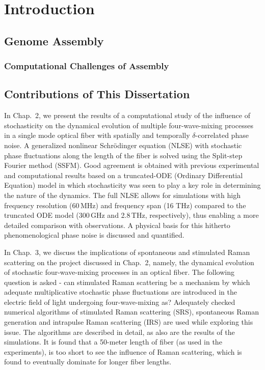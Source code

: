 
\newcommand{\edit}[1]{\textcolor{black}{#1}}

\renewcommand{\thechapter}{1}

\chapter{Introduction}



\section{Genome Assembly}

\subsection{Computational Challenges of Assembly}


\section{Contributions of This Dissertation}

In Chap.\ 2, we present the results of a computational study of the
influence of stochasticity on the dynamical evolution of multiple
four-wave-mixing processes in a single mode optical fiber with spatially
and temporally $\delta$-correlated phase noise. A generalized nonlinear
Schr\"odinger equation (NLSE) with stochastic phase fluctuations along the
length of the fiber is solved using the Split-step Fourier method
(SSFM). Good agreement is obtained with previous experimental and
computational results based on a truncated-ODE (Ordinary Differential
Equation) model in which stochasticity was seen to play a key role in
determining the nature of the dynamics. The full NLSE allows for
simulations with high frequency resolution (60\,MHz) and frequency span (16
THz) compared to the truncated ODE model (300\,GHz and 2.8\,THz,
respectively), thus enabling a more detailed comparison with
observations. A physical basis for this hitherto phenomenological phase
noise is discussed and quantified.

In Chap.\ 3, we discuss the implications of spontaneous and stimulated
Raman scattering on the project discussed in Chap.\ 2, namely, the dynamical evolution of
stochastic four-wave-mixing processes in an optical fiber.
The following question is asked - can stimulated Raman scattering be a mechanism by which
adequate multiplicative stochastic phase fluctuations are introduced in the
electric field of light undergoing four-wave-mixing as? Adequately checked numerical
algorithms of stimulated Raman scattering (SRS), spontaneous Raman generation and intrapulse
Raman scattering (IRS) are used while exploring this issue. The algorithms are described in detail, as also are
the results of the simulations. It is found that a 50-meter length of fiber (as used in the experiments),
is too short to see the influence of Raman scattering, which is found to eventually
dominate for longer fiber lengths.

